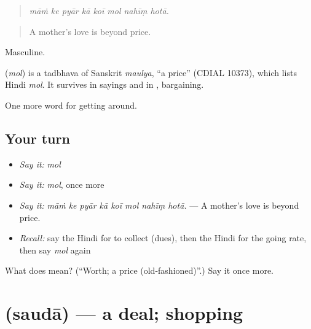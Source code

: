 \begin{quote}
       
\end{quote}

\begin{quote}
\emph{māṁ ke pyār kā koī mol nahīṃ hotā.}
\end{quote}

\begin{quote}
A mother's love is beyond price.
\end{quote}

Masculine.

\begin{cousinweb}
\textbf{} (\emph{mol}) is a tadbhava of Sanskrit \emph{maulya}, \textquotedblleft{}a price\textquotedblright{} (CDIAL 10373), which lists Hindi \emph{mol}. It survives in sayings and in , bargaining.
\end{cousinweb}

\begin{grammarlens}[title={What you've built}]
One more word for getting around.
\end{grammarlens}

\subsection*{Your turn}
\begin{itemize}
\raggedright
  \item \emph{Say it:} \emph{mol}
  \item \emph{Say it:} \emph{mol}, once more
  \item \emph{Say it:} \emph{māṁ ke pyār kā koī mol nahīṃ hotā.} — A mother's love is beyond price.
  \item \emph{Recall:} say the Hindi for to collect (dues), then the Hindi for the going rate, then say \emph{mol} again
\end{itemize}

\begin{tcolorbox}[breakable,colback=teal!4,colframe=teal!35!black,title={Before you move on}]
What does  mean? (\textquotedblleft{}Worth; a price (old-fashioned)\textquotedblright{}.) Say it once more.
\end{tcolorbox}
\section[\texorpdfstring{\hi{सौदा} (saudā)}{सौदा (saudā)}]{ (saudā) — a deal; shopping}


